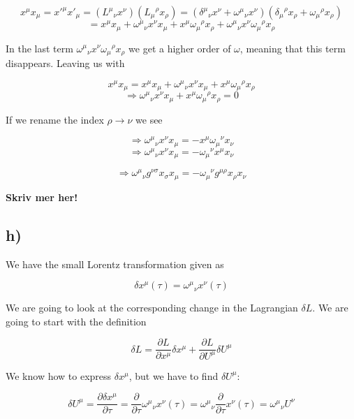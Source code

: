 \documentclass[a4paper,norsk, 10pt]{article}
\begin{document}
$$
x^{\mu}x_{\mu} = {x'}^{\mu}{x'}_{\mu} = ({L^{\mu}}_{\nu}x^{\nu})({L_{\mu}}^{\rho}x_{\rho}) = ({\delta^{\mu}}_{\nu}x^{\nu} + {\omega^{\mu}}_{\nu} x^{\nu})({\delta_{\mu}}^{\rho}x_{\rho} + {\omega_{\mu}}^{\rho}x_{\rho})
$$
$$
= x^{\mu}x_{\mu} + {\omega^{\mu}}_{\nu} x^{\nu}x_{\mu} + x^{\mu}{\omega_{\mu}}^{\rho}x_{\rho} + {\omega^{\mu}}_{\nu} x^{\nu}{\omega_{\mu}}^{\rho}x_{\rho}
$$

In the last term ${\omega^{\mu}}_{\nu} x^{\nu}{\omega_{\mu}}^{\rho}x_{\rho}$ we get a higher order of $\omega$, meaning that this term disappears. Leaving us with

$$
x^{\mu}x_{\mu} = x^{\mu}x_{\mu} + {\omega^{\mu}}_{\nu} x^{\nu}x_{\mu} + x^{\mu}{\omega_{\mu}}^{\rho}x_{\rho}
$$
$$
\Rightarrow {\omega^{\mu}}_{\nu} x^{\nu}x_{\mu} + x^{\mu}{\omega_{\mu}}^{\rho}x_{\rho} = 0
$$

If we rename the index $\rho \rightarrow \nu$ we see

$$
\Rightarrow {\omega^{\mu}}_{\nu} x^{\nu}x_{\mu} = - x^{\mu}{\omega_{\mu}}^{\nu}x_{\nu} 
$$
$$
\Rightarrow {\omega^{\mu}}_{\nu} x^{\nu}x_{\mu} = - {\omega_{\mu}}^{\nu}x^{\mu}x_{\nu} 
$$

$$
\Rightarrow {\omega^{\mu}}_{\nu} g^{\nu \sigma}x_{\sigma}x_{\mu} = - {\omega_{\mu}}^{\nu}g^{\mu \rho}x_{\rho}x_{\nu} 
$$


\textbf{Skriv mer her!}

\subsection*{h)}

We have the small Lorentz transformation given as

\begin{equation}
\delta x^{\mu}(\tau) = {\omega^{\mu}}_{\nu}x^{\nu}(\tau)
\end{equation}

We are going to look at the corresponding change in the Lagrangian $\delta L$. We are going to start with the definition

$$
\delta L = \frac{\partial L}{\partial x^{\mu}}\delta x^{\mu} + \frac{\partial L}{\partial U^{\mu}}\delta U^{\mu}
$$

We know how to express $\delta x^{\mu}$, but we have to find $\delta U^{\mu}$:

$$
\delta U^{\mu} = \frac{\partial \delta x^{\mu}}{\partial \tau} = \frac{\partial}{\partial \tau} {\omega^{\mu}}_{\nu}x^{\nu}(\tau) =  {\omega^{\mu}}_{\nu}\frac{\partial}{\partial \tau} x^{\nu}(\tau) = {\omega^{\mu}}_{\nu}U^{\nu}
$$
\end{document}

